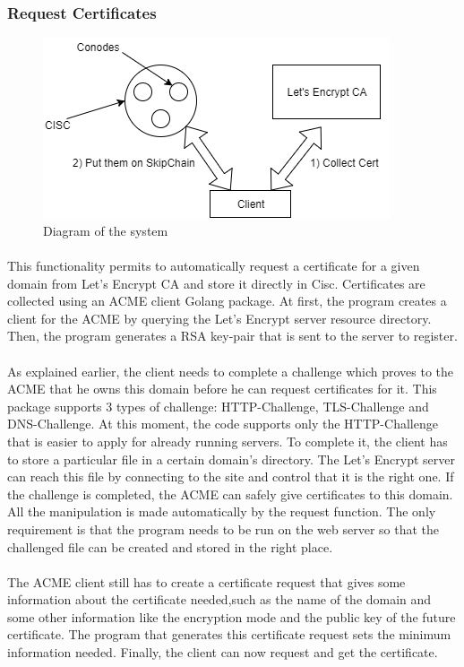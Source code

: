 \documentclass[11pt, a4paper, twoside, openright]{article}
\begin{document}
\subsubsection{Request Certificates}
\begin{figure}
   \centering
   \includegraphics[scale=0.5]{System.png}
   \caption{ Diagram of the system\label{overflow}}
\end{figure}
\paragraph{} This functionality permits to automatically request a certificate for a given domain from Let's Encrypt CA and store it directly in Cisc.  
Certificates are collected using an ACME client Golang package. At first, the program creates a client for the ACME by querying the Let's Encrypt server resource directory. Then, the program generates a RSA key-pair that is sent to the server to register.
\paragraph{}
As explained earlier, the client needs to complete a challenge which proves to the ACME that he owns this domain before he can request certificates for it. This package supports 3 types of challenge: HTTP-Challenge, TLS-Challenge and DNS-Challenge. At this moment, the code supports only the HTTP-Challenge that is easier to apply for already running servers. To complete it, the client has to store a particular file in a certain domain's directory. The Let's Encrypt server can reach this file by connecting to the site and control that it is the right one. If the challenge is completed, the ACME can safely give certificates to this domain. All the manipulation is made automatically by the request function. The only requirement is that the program needs to be run on the web server so that the challenged file can be created and stored in the right place.       
\paragraph{}
The ACME client still has to create a certificate request that gives some information about the certificate needed,such  as the name of the domain and some other information like the encryption mode and the public key of the future certificate. The program that generates this certificate request sets the minimum information needed. Finally, the client can now request and get the certificate.
\end{document}
